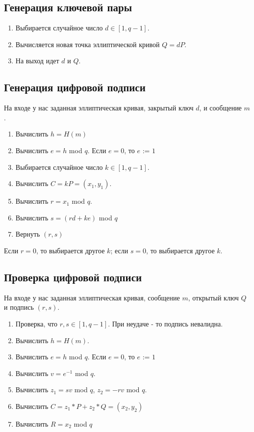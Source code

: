 \documentclass[colorthm]{./civarticle}
\begin{document}
\subsection{Генерация ключевой пары}

\begin{enumerate}
    \item Выбирается случайное число $d \in [1, q-1]$.
    \item Вычисляется новая точка эллиптической кривой $Q=dP$.
    \item На выход идет $d$ и $Q$.
\end{enumerate}

\subsection{Генерация цифровой подписи}
На входе у нас заданная эллиптическая кривая, закрытый ключ $d$, и сообщение $m$.

\begin{enumerate}
    \item Вычислить $h = H(m)$
    \item Вычислить $e = h$ mod $q$. Если $e=0$, то $e$ := $1$
    \item Выбирается случайное число $k \in [1, q-1]$.
    \item Вычислить $C=kP = (x_1, y_1)$.
    \item Вычислить $r = x_1$ mod $q$.
    \item Вычислить $s = (rd + ke)$ mod $q$
    \item Вернуть $(r, s)$
\end{enumerate}

Если $r=0$, то выбирается другое $k$; если $s=0$, то выбирается другое $k$.

\subsection{Проверка цифровой подписи}
На входе у нас заданная эллиптическая кривая, сообщение $m$, открытый ключ $Q$ и подпись $(r, s)$.

\begin{enumerate}
    \item Проверка, что $r, s \in [1, q-1]$. При неудаче - то подпись невалидна.
    \item Вычислить $h = H(m)$.
    \item Вычислить $e = h$ mod $q$. Если $e=0$, то $e$ := $1$
    \item Вычислить $v = e^{-1} $ mod $q$.
    \item Вычислить $z_1 = sv$ mod $q$, $z_2 = -rv$ mod $q$.
    \item Вычислить $C = z_1*P + z_2*Q = (x_2, y_2)$
    \item Вычислить $R = x_2 $ mod $q$
\end{enumerate}
\end{document}
